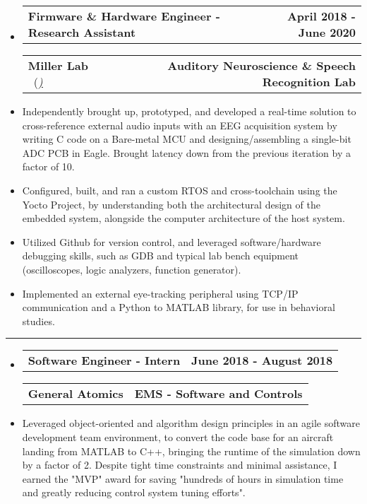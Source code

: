 \documentclass[10pt,letterpaper]{article}
\makeatletter
\newcommand{\header}[2]
{
	\begin{tabular*}{\linewidth}{l @{\extracolsep{\fill}} r}
		\hspace{-27pt} #1 & #2 \\
	\end{tabular*}
}
\makeatother
\begin{document}
\begin{itemize}
	\item[]
		\header
			{\textbf{Firmware \& Hardware Engineer - Research Assistant}} 
			{\textbf{April 2018 - June 2020}}
		\header
		{\textbf{Miller Lab} \ (\href{https://millerlab.faculty.ucdavis.edu}{\small \emph{\underline{\smash{millerlab.faculty.ucdavis.edu})}}} }
			{\textbf{Auditory Neuroscience \& Speech Recognition Lab}} 
		\item
			Independently brought up, prototyped, and developed a real-time solution to cross-reference external audio inputs with an EEG acquisition system by writing C code on a Bare-metal MCU and designing/assembling a single-bit ADC PCB in Eagle. Brought latency down from the previous iteration by a factor of 10.
		\item 
			Configured, built, and ran a custom RTOS and cross-toolchain using the Yocto Project, by understanding both the architectural design of the embedded system, alongside the computer architecture of the host system.
		\item
			Utilized Github for version control, and leveraged software/hardware debugging skills, such as GDB and typical lab bench equipment (oscilloscopes, logic analyzers, function generator).
		\item 
			Implemented an external eye-tracking peripheral using TCP/IP communication and a Python to MATLAB library, for use in behavioral studies.
\end{itemize}

\hrule

\begin{itemize}
	\item[]
		\header
			{\textbf{Software Engineer - Intern}} 
			{\textbf{June 2018 - August 2018}}
		\header
			{\textbf{General Atomics}}
			{\textbf{EMS - Software and Controls}} 
		\item
			Leveraged object-oriented and algorithm design principles in an agile software development team environment, to convert the code base for an aircraft landing from MATLAB to C++, bringing the runtime of the simulation down by a factor of 2. Despite tight time constraints and minimal assistance, I earned the "MVP" award for saving "hundreds of hours in simulation time and greatly reducing control system tuning efforts".


\end{itemize}

\vspace{-1.5em}
\end{document}
